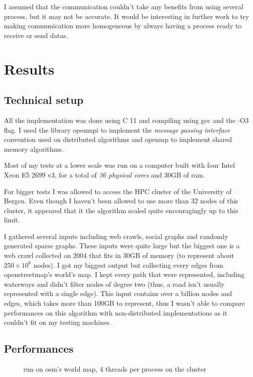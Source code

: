 \documentclass[12px]{article}
\begin{document}
    I assumed that the communication couldn't take any benefits from using several process, but it may not be accurate.
    It would be interesting in further work to try making communication more homogeneous by always having a process ready to receive or send datas.

  \section{Results}
    \subsection{Technical setup}
      All the implementation was done using \textsf{C 11} and compiling using \textsf{gcc} and the \textsf{-O3} flag.
      I used the library \textsf{openmpi} to implement the \emph{message passing interface} convention used on distributed algorithms and \textsf{openmp} to implement shared memory algorithms.

      Most of my tests at a lower scale was run on a computer built with four Intel Xeon E5 2699 v3, for a total of \emph{36 physical cores} and 30GB of ram.

      For bigger tests I was allowed to access the HPC cluster of the University of Bergen.
      Even though I haven't been allowed to use more than 32 nodes of this cluster, it appeared that it the algorithm scaled quite encouragingly up to this limit.

      I gathered several inputs including web crawls, social graphs and randomly generated sparse graphs.
      These inputs were quite large but the biggest one is a web crawl collected on 2004 that fits in 30GB of memory (to represent about $250 \times 10^6$ nodes). I got my biggest output but collecting every edges from openstreetmap's world's map.
      I kept every path that were represented, including waterways and didn't filter nodes of degree two (thus, a road isn't usually represented with a single edge).
      This input contains over a billion nodes and edges, which takes more than 100GB to represent, thus I wasn't able to compare performances on this algorithm with non-distributed implementations as it couldn't fit on my testing machines.

    \subsection{Performances}
      \begin{figure}[ht]
        \label{graph:planet_4th}
        \caption{run on osm's world map, 4 threads per process on the cluster}
        \centering
        \scalebox{0.7}{}
      \end{figure}
\end{document}
